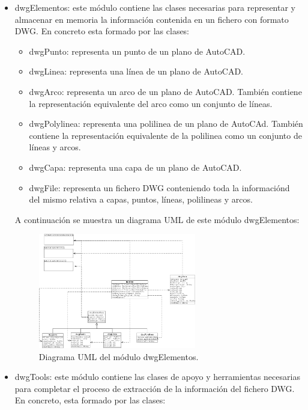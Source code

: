 \begin{itemize}

\item{dwgElementos: este módulo contiene las clases necesarias para representar y almacenar en memoria la información contenida en un fichero con formato DWG. En concreto esta formado por las clases:}

\begin{itemize}

\item{dwgPunto: representa un punto de un plano de AutoCAD.}
\item{dwgLinea: representa una línea de un plano de AutoCAD.}
\item{dwgArco: representa un arco de un plano de AutoCAD. También contiene la representación equivalente del arco como un conjunto de líneas.}
\item{dwgPolylinea: representa una polilinea de un plano de AutoCAd. También contiene la representación equivalente de la polilinea como un conjunto de líneas y arcos.}
\item{dwgCapa: representa una capa de un plano de AutoCAD.}
\item{dwgFile: representa un fichero DWG conteniendo toda la informaciónd del mismo relativa a capas, puntos, líneas, polilineas y arcos.}

\end{itemize}

A continuación se muestra un diagrama UML de este módulo dwgElementos:

\begin{figure}[H]
\begin{center}
\includegraphics[width=0.65\textwidth]{imgs/dwgElementos}
\caption{Diagrama UML del módulo dwgElementos.}
\end{center}
\end{figure}

\item{dwgTools: este módulo contiene las clases de apoyo y herramientas necesarias para completar el proceso de extracción de la información del fichero DWG. En concreto, esta formado por las clases:}


\end{itemize}
